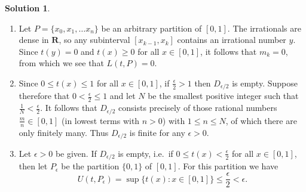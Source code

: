 \documentclass[12pt]{article}
\theoremstyle{definition}
\theoremstyle{exercise}
\theoremstyle{solution}
\newtheorem*{solution}{Solution}
\newcommand{\R}{\mathbf{R}}
\begin{document}
\begin{solution}
    \begin{enumerate}
        \item Let \( P = \{ x_0, x_1, \ldots x_n \} \) be an arbitrary partition of \( [0, 1] \). The irrationals are dense in \( \R \), so any subinterval \( [x_{k-1}, x_k] \) contains an irrational number \( y \). Since \( t(y) = 0 \) and \( t(x) \geq 0 \) for all \( x \in [0, 1] \), it follows that \( m_k = 0 \), from which we see that \( L(t, P) = 0 \).

        \item Since \( 0 \leq t(x) \leq 1 \) for all \( x \in [0, 1] \), if \( \tfrac{\epsilon}{2} > 1 \) then \( D_{\epsilon/2} \) is empty. Suppose therefore that \( 0 < \tfrac{\epsilon}{2} \leq 1 \) and let \( N \) be the smallest positive integer such that \( \tfrac{1}{N} < \tfrac{\epsilon}{2} \). It follows that \( D_{\epsilon/2} \) consists precisely of those rational numbers \( \tfrac{m}{n} \in [0, 1] \) (in lowest terms with \( n > 0 \)) with \( 1 \leq n \leq N \), of which there are only finitely many. Thus \( D_{\epsilon/2} \) is finite for any \( \epsilon > 0 \).

        \item Let \( \epsilon > 0 \) be given. If \( D_{\epsilon/2} \) is empty, i.e.\ if \( 0 \leq t(x) < \tfrac{\epsilon}{2} \) for all \( x \in [0, 1] \), then let \( P_{\epsilon} \) be the partition \( \{ 0, 1 \} \) of \( [0, 1] \). For this partition we have
        \[
            U(t, P_{\epsilon}) = \sup \{ t(x) : x \in [0, 1] \} \leq \frac{\epsilon}{2} < \epsilon.
        \]


\end{enumerate}
\end{solution}
\end{document}
